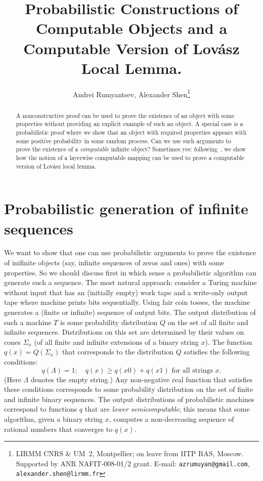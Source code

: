\documentclass[12pt]{article}
\title{Probabilistic Constructions of Computable Objects and a Computable Version of Lov\'asz Local Lemma.}
\author{Andrei Rumyantsev, Alexander Shen\thanks{LIRMM CNRS \& UM~2, Montpellier; on leave from IITP RAS, Moscow. Supported by ANR NAFIT-008-01/2 grant. E-mail: \texttt{azrumuyan@gmail.com}, \texttt{alexander.shen@lirmm.fr}}}
\begin{document}
\maketitle

\begin{abstract}
A nonconstructive proof can be used to prove the existence of an object with some properties without providing an explicit example of such an object. A special case is a probabilistic proof  where we show that an object with required properties appears with some positive probability in some random process. Can we use such arguments to prove  the existence of a \emph{computable} infinite object? Sometimes yes: following~\cite{rumyantsev-positive}, we show how the notion of a layerwise computable mapping can be used to prove a computable version of Lov\'asz local lemma.
\end{abstract}

\section{Probabilistic generation of infinite sequences}

We want to show that one can use probabilistic arguments to prove the existence of inifinite objects (say, infinite sequences of zeros and ones) with some properties. So we should discuss first in which sense a probabilistic algorithm can generate such a sequence. The most natural approach: consider a Turing machine without input that has an (initially empty) work tape and a write-only output tape where machine prints bits sequentially. Using fair coin tosses, the machine generates a (finite or infinite) sequence of output bits. The output distribution of such a machine $T$ is some probability distribution $Q$ on the set of all finite and infinite sequences. Distributions on this set are determined by their values on cones $\Sigma_x$ (of all finite and infinite extensions of a binary string $x$). The function $q(x) = Q(\Sigma_x)$ that corresponds to the distribution $Q$ satisfies the following conditions:
    $$ q(\Lambda)=1;\quad q(x)\ge q(x0)+q(x1) \text{ \ for all strings $x$}.$$
(Here $\Lambda$ denotes the empty string.) Any non-negative real function that satisfies these conditions corresponds to some probability distribution on the set of finite and infinite binary sequences. The output distributions of probabilistic machines correspond to functions $q$ that are \emph{lower semicomputable}; this means that some algorithm, given a binary string $x$, computes a non-decreasing sequence of rational numbers that converges to $q(x)$.
\end{document}

